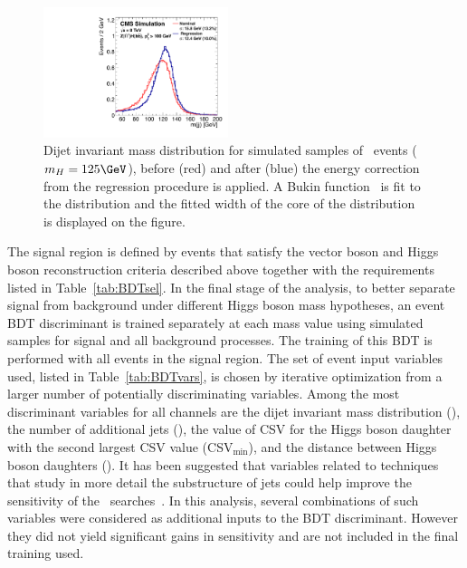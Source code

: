 \documentclass[12pt,twoside,a4paper,cmspaper,final,collab]{cms-tdr}
\begin{document}
\begin{figure}[tbhp]
 \begin{center}
    \includegraphics[width=0.48\textwidth]{Hmass_Regression_Simulation_Oct08.pdf}
    \caption{Dijet invariant mass distribution for simulated samples of \ZllHbb\ events ($m_{H} = 125\GeV$), before (red) and after (blue) the energy correction from the
regression procedure is applied. A Bukin function~\cite{Verkerke:2003ir} is fit to the distribution and the fitted width of the core of the distribution is displayed on the figure.
    }
    \label{fig:regression_VV_VH}
  \end{center}
\end{figure}



The signal region is defined by events that satisfy the vector boson and Higgs boson reconstruction criteria
described above together with the requirements listed in Table~\ref{tab:BDTsel}.
In the final stage of the analysis, to better separate signal from background under
different Higgs boson mass hypotheses, an event BDT discriminant is trained separately at
each mass value using simulated samples for signal and all background
processes. The training of this BDT is performed with all events in the signal region.
The set of event input variables used, listed in Table~\ref{tab:BDTvars},  is chosen by iterative optimization from a larger number of
potentially discriminating variables. Among the most discriminant
variables for all channels are the dijet invariant mass distribution
(\Mjj), the number of additional jets (\Naj), the value of CSV for the
Higgs boson daughter
with the second largest CSV value (CSV$_{\text{min}}$), and the
distance between Higgs boson daughters (\dRJJ). It has been suggested that variables related to techniques
that study in more detail the substructure of jets could help improve
the sensitivity of the \HBB\ searches~\cite{PhysRevLett.100.242001}. %
In this analysis, several combinations of such variables were
considered as additional inputs
to the BDT discriminant. However they did not yield significant gains in
sensitivity and  are not included in the final training used.
\end{document}
